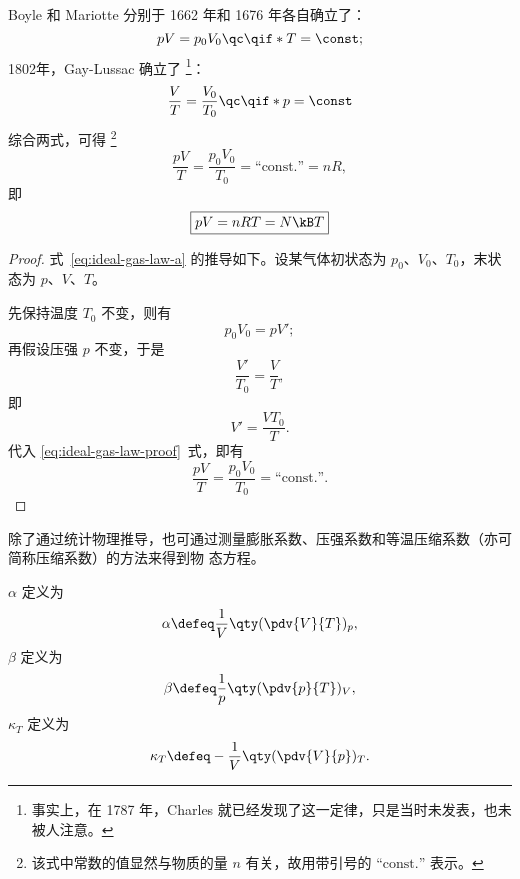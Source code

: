 Boyle 和 Mariotte 分别于 1662 年和 1676 年各自确立了：
\begin{equation}
  pV = p_0 V_0 \qc\qif* T = \const;
\end{equation}
1802年，Gay-Lussac 确立了
\footnote{事实上，在 1787 年，Charles 就已经发现了这一定律，只是当时未发表，也未被人注意。}：
\begin{equation}
  \frac{V}{T} = \frac{V_0}{T_0} \qc\qif* p = \const
\end{equation}
综合两式，可得
\footnote{该式中常数的值显然与物质的量 $n$ 有关，故用带引号的 $\text{``const.''}$ 表示。}
\begin{equation} \label{eq:ideal-gas-law-a}
  \frac{pV}{T} = \frac{p_0 V_0}{T_0} = \text{``const.''} = nR,
\end{equation}
即
\begin{equation} \label{eq:ideal-gas-law-b}
  \boxed{pV = nRT = N \kB T}
\end{equation}

\begin{proof}
  式~\eqref{eq:ideal-gas-law-a} 的推导如下。设某气体初状态为 $p_0$、$V_0$、$T_0$，末状态为 $p$、$V$、$T$。

  先保持温度 $T_0$ 不变，则有
  \begin{equation} \label{eq:ideal-gas-law-proof}
    p_0 V_0 = p V';
  \end{equation}
  再假设压强 $p$ 不变，于是
  \begin{equation}
    \frac{V'}{T_0} = \frac{V}{T},
  \end{equation}
  即
  \begin{equation}
    V' = \frac{V T_0}{T}.
  \end{equation}
  代入 \eqref{eq:ideal-gas-law-proof}~式，即有
  \begin{equation}
    \frac{p V}{T} = \frac{p_0 V_0}{T_0} = \text{``const.''}.
  \end{equation}
\end{proof}

除了通过统计物理推导，也可通过测量膨胀系数、压强系数和等温压缩系数（亦可简称压缩系数）的方法来得到物
态方程。

 $\alpha$ 定义为
\begin{equation}
  \alpha \defeq \frac{1}{V} \qty(\pdv{V}{T})_p,
\end{equation}
 $\beta$ 定义为
\begin{equation}
  \beta \defeq \frac{1}{p} \qty(\pdv{p}{T})_V,
\end{equation}
 $\kappa_T$ 定义为
\begin{equation}
  \kappa_T \defeq -\frac{1}{V} \qty(\pdv{V}{p})_T.
\end{equation}


